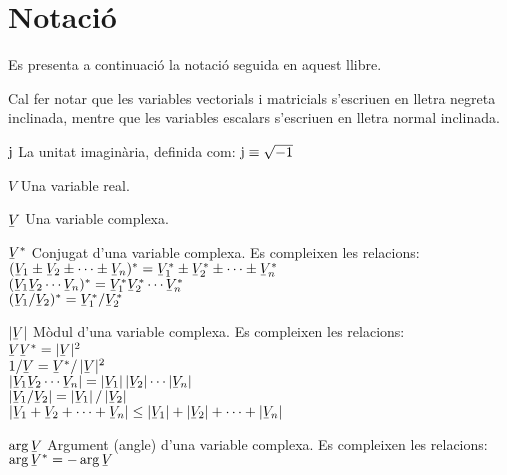 \chapter*{Notació} 

Es presenta a continuació la notació seguida en aquest llibre.

Cal fer notar que les variables vectorials i matricials s'escriuen
en lletra negreta inclinada,  mentre que les variables escalars
s'escriuen en lletra normal inclinada.

\begin{list}{}
{\setlength{\labelwidth}{15mm} \setlength{\leftmargin}{20mm}
\setlength{\labelsep}{5mm}}
    \item[$\mathrm{j}$] La unitat imaginària, definida com:
    $\mathrm{j}\equiv\sqrt{-1}$
    \item[$V$] Una variable real.
    \item[$\cmplx{V}$] Una variable complexa.
    \item[$\cmplx{V}^*$] Conjugat d'una variable complexa.
    Es compleixen les relacions:\\[1ex]
     $(\cmplx{V}_1 \pm \cmplx{V}_2 \pm \cdots  \pm \cmplx{V}_n)^* = \cmplx{V}_1^* \pm
    \cmplx{V}_2^*\pm\cdots\pm\cmplx{V}_n^*$\\[1ex]
    $(\cmplx{V}_1 \cmplx{V}_2 \cdots \cmplx{V}_n)^* = \cmplx{V}_1^*  \cmplx{V}_2^*
    \cdots \cmplx{V}_n^*$\\[1ex]
    $(\cmplx{V}_1 / \cmplx{V}_2)^* = \cmplx{V}_1^* / \cmplx{V}_2^*$
    \item[$|\cmplx{V}|$] Mòdul d'una variable complexa.
    Es compleixen les relacions:\\[1ex]
      $\cmplx{V}\cmplx{V}^* = |\cmplx{V}|^2$\\[1ex]
      $1/ \cmplx{V} = \cmplx{V}^* / \,|\cmplx{V}|^2$\\[1ex]
      $|\cmplx{V}_1 \cmplx{V}_2 \cdots \cmplx{V}_n| =
       |\cmplx{V}_1| \,|\cmplx{V}_2| \cdots |\cmplx{V}_n|$\\[1ex]
       $|\cmplx{V}_1 / \cmplx{V}_2| = |\cmplx{V}_1| \,/ \,|\cmplx{V}_2|$\\[1ex]
      $|\cmplx{V}_1+\cmplx{V}_2+\cdots+\cmplx{V}_n| \leq
      |\cmplx{V}_1| + |\cmplx{V}_2| + \cdots  +|\cmplx{V}_n|$
    \item[$\arg\cmplx{V}$] Argument (angle) d'una variable complexa.
     Es compleixen les relacions:\\[1ex]
      $\arg\cmplx{V}^* = - \arg\cmplx{V}$\\[1ex]

\end{list}
